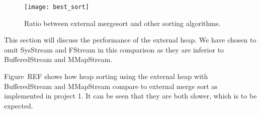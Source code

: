 \begin{figure}
  \centering
  \texttt{[image: best\_sort]}
  \caption{Ratio between external mergesort and other sorting algorithms.}
  \label{fig:best_sort}
\end{figure}

This section will discuss the performance of the external heap. We have chosen to omit SysStream and FStream in this comparison as they are inferior to BufferedStream and MMapStream.

Figure~REF shows how heap sorting using the external heap with BufferedStream and MMapStream compare to external merge sort as implemented in project 1. It can be seen that they are both slower, which is to be expected.

